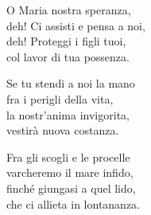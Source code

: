 
\strofa O Maria nostra speranza,\\
deh! Ci assisti e pensa a noi,\\
deh! Proteggi i figli tuoi,\\
col lavor di tua possenza.

\spazio


\spazio

\strofa Se tu stendi a noi la mano\\
fra i perigli della vita,\\
la nostr'anima invigorita,\\
vestirà nuova costanza.

\spazio


\spazio

\strofa Fra gli scogli e le procelle\\
varcheremo il mare infido,\\
finché giungasi a quel lido,\\
che ci allieta in lontananza.

\spazio

